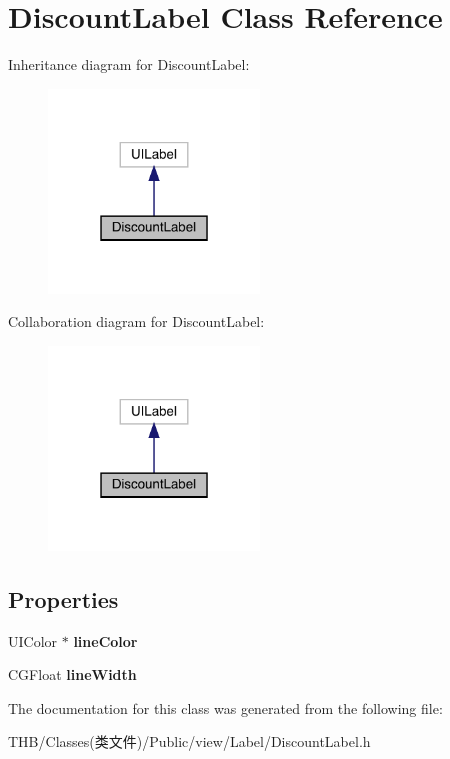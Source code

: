 \hypertarget{interface_discount_label}{}\section{Discount\+Label Class Reference}
\label{interface_discount_label}


Inheritance diagram for Discount\+Label\+:\nopagebreak
\begin{figure}[H]
\begin{center}
\leavevmode
\includegraphics[width=159pt]{interface_discount_label__inherit__graph}
\end{center}
\end{figure}


Collaboration diagram for Discount\+Label\+:\nopagebreak
\begin{figure}[H]
\begin{center}
\leavevmode
\includegraphics[width=159pt]{interface_discount_label__coll__graph}
\end{center}
\end{figure}
\subsection*{Properties}
\begin{DoxyCompactItemize}
\item 
\mbox{\label{interface_discount_label_a9f36ba454f77bde6c47d9b92ad918c22}} 
U\+I\+Color $\ast$ {\bfseries line\+Color}
\item 
\mbox{\label{interface_discount_label_acf80bae1f614a7c8a2a8c459572876c0}} 
C\+G\+Float {\bfseries line\+Width}
\end{DoxyCompactItemize}


The documentation for this class was generated from the following file\+:\begin{DoxyCompactItemize}
\item 
T\+H\+B/\+Classes(类文件)/\+Public/view/\+Label/Discount\+Label.\+h\end{DoxyCompactItemize}
